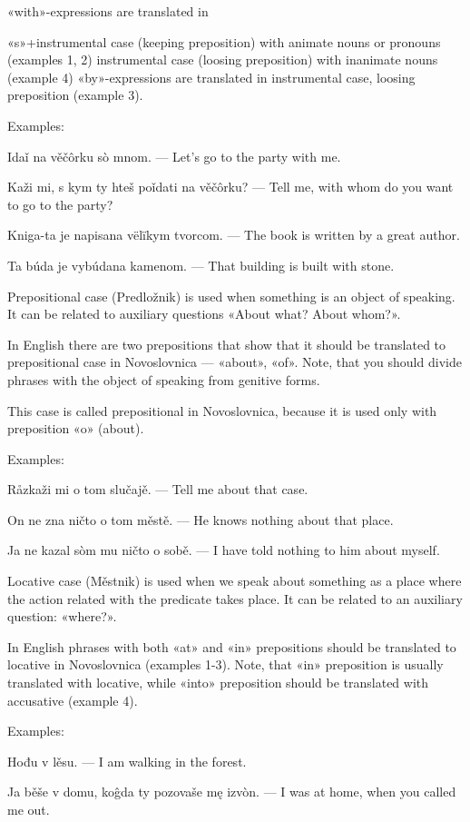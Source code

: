 «with»-expressions are translated in

«s»+instrumental case (keeping preposition) with animate nouns or pronouns (examples 1, 2)
instrumental case (loosing preposition) with inanimate nouns (example 4)
«by»-expressions are translated in instrumental case, loosing preposition (example 3).

Examples:

Idaǐ na věčôrku sò mnom. — Let's go to the party with me.

Kaži mi, s kym ty hteš poǐdati na věčôrku? — Tell me, with whom do you want to go to the party?

Kniga-ta je napisana vëlïkym tvorcom. — The book is written by a great author.

Ta búda je vybúdana kamenom. — That building is built with stone.

Prepositional case (Predložnik) is used when something is an object of speaking. It can be related to auxiliary questions «About what? About whom?».

In English there are two prepositions that show that it should be translated to prepositional case in Novoslovnica — «about», «of». Note, that you should divide phrases with the object of speaking from genitive forms.

This case is called prepositional in Novoslovnica, because it is used only with preposition «o» (about).

Examples:

Råzkaži mi o tom slučajě. — Tell me about that case.

On ne zna ničto o tom městě. — He knows nothing about that place.

Ja ne kazal sòm mu ničto o sobě. — I have told nothing to him about myself.

Locative case (Městnik) is used when we speak about something as a place where the action related with the predicate takes place. It can be related to an auxiliary question: «where?».

In English phrases with both «at» and «in» prepositions should be translated to locative in Novoslovnica (examples 1-3). Note, that «in» preposition is usually translated with locative, while «into» preposition should be translated with accusative (example 4).

Examples:

Hođu v lěsu. — I am walking in the forest.

Ja běše v domu, koĝda ty pozovaše mę izvòn. — I was at home, when you called me out.

